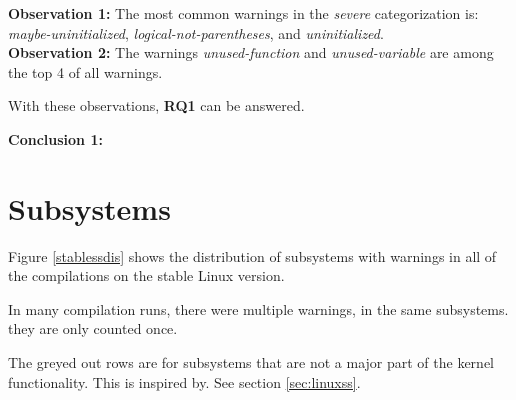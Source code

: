 \documentclass[a4paper,11pt]{report}
\begin{document}
\textbf{Observation 1:}
The most common warnings in the \emph{severe} categorization is: 
\emph{maybe-uninitialized}, \emph{logical-not-parentheses}, and 
\emph{uninitialized}.
\\

\textbf{Observation 2:}
The warnings \emph{unused-function} and \emph{unused-variable} are among the 
top 4 of all warnings.


With these observations, \textbf{RQ1} can be answered.

\textbf{Conclusion 1:}







            \section{Subsystems}
Figure \ref{stablessdis} shows the distribution of subsystems with warnings in 
all of the compilations on the stable Linux version.

In many compilation runs, there were multiple warnings, in the same subsystems. 
they are only counted once.

The greyed out rows are for subsystems that are not a major part of the kernel 
functionality. This is inspired by\cite{42bugs}. See section \ref{sec:linuxss}.
\\
\end{document}
